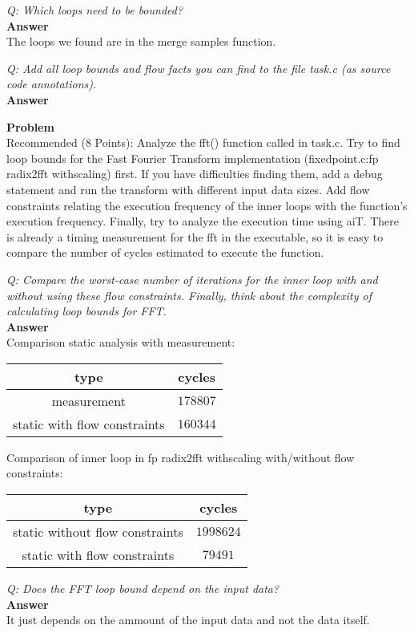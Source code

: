 \documentclass[a4paper,english,12pt,oneside]{article}
\newcounter{problemcounter}
\newcommand{\Prob}[1]{
\stepcounter{problemcounter}
\noindent\textbf{Problem \arabic{problemcounter}}\\
#1}
\newcommand{\Quest}[2]{
\noindent\emph{Q: #1}\\[0.7cm]
\noindent\textbf{Answer}\\
\noindent #2
}
\begin{document}
\Quest{Which loops need to be bounded?}
{
The loops we found are in the merge samples function.
}

\Quest{Add all loop bounds and flow facts you can find to the file task.c (as source code annotations).}
{

}




\Prob{Recommended (8 Points): Analyze the fft() function called in task.c. Try to find loop bounds for the Fast Fourier Transform implementation (fixedpoint.c:fp radix2fft withscaling) first. If you have difficulties finding them, add a debug statement and run the transform with different input data sizes. Add flow constraints relating the execution frequency of the inner loops with the function’s execution frequency. Finally, try to analyze the execution time using aiT. There is already a timing measurement for the fft in the executable, so it is easy to compare the number of cycles estimated to execute the function.}

\Quest{Compare the worst-case number of iterations for the inner loop with and without using these flow constraints. Finally, think about the complexity of calculating loop bounds for FFT.}
{
Comparison static analysis with measurement:

\begin{tabular}{|c|c|}
\hline
 type & cycles \\ \hline
 measurement & $178807$ \\ \hline
 static with flow constraints & $160344$\\ \hline
\end{tabular}

Comparison of inner loop in fp radix2fft withscaling with/without flow constraints:
\begin{tabular}{|c|c|}
    \hline
 type & cycles \\ \hline
 static without flow constraints & $1998624$ \\ \hline
 static with flow constraints & $79491$\\ \hline
\end{tabular}

}

\Quest{Does the FFT loop bound depend on the input data?}
{
It just depends on the ammount of the input data and not the data itself.
}
\end{document}
